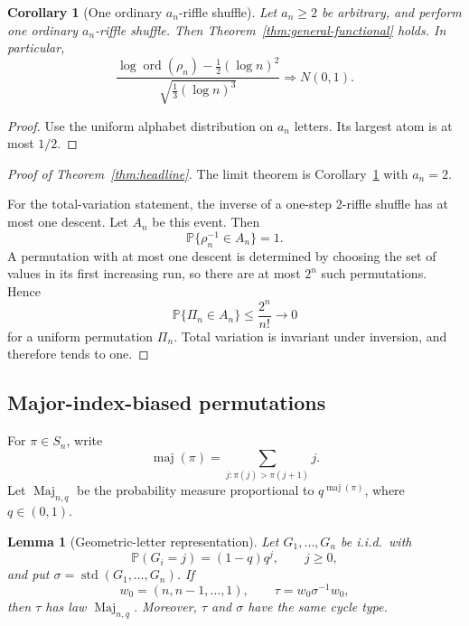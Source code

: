 \documentclass[11pt]{article}
\newtheorem{lemma}[theorem]{Lemma}
\newtheorem{corollary}[theorem]{Corollary}
\theoremstyle{definition}
\theoremstyle{remark}
\newcommand{\Pp}{\mathbb P}
\newcommand{\ord}{\operatorname{ord}}
\begin{document}
\begin{corollary}[One ordinary $a_n$-riffle shuffle]
\label{cor:ordinary-riffle}
Let $a_n\ge2$ be arbitrary, and perform one ordinary $a_n$-riffle shuffle.
Then Theorem~\ref{thm:general-functional} holds.  In particular,
\[
 \frac{\log\ord(\rho_n)-\frac12(\log n)^2}
 {\sqrt{\frac13(\log n)^3}}
 \Rightarrow N(0,1).
\]
\end{corollary}

\begin{proof}
Use the uniform alphabet distribution on $a_n$ letters.  Its largest atom
is at most $1/2$.
\end{proof}

\begin{proof}[Proof of Theorem~\ref{thm:headline}]
The limit theorem is Corollary~\ref{cor:ordinary-riffle} with $a_n=2$.

For the total-variation statement, the inverse of a one-step $2$-riffle
shuffle has at most one descent.  Let $A_n$ be this event.  Then
\[
 \Pp\{\rho_n^{-1}\in A_n\}=1.
\]
A permutation with at most one descent is determined by choosing the set
of values in its first increasing run, so there are at most $2^n$ such
permutations.  Hence
\[
 \Pp\{\Pi_n\in A_n\}\le\frac{2^n}{n!}\longrightarrow0
\]
for a uniform permutation $\Pi_n$.  Total variation is invariant under
inversion, and therefore tends to one.
\end{proof}

\subsection{Major-index-biased permutations}

For $\pi\in S_n$, write
\[
 \operatorname{maj}(\pi)
 =
 \sum_{j:\pi(j)>\pi(j+1)}j.
\]
Let $\operatorname{Maj}_{n,q}$ be the probability measure proportional to
$q^{\operatorname{maj}(\pi)}$, where $q\in(0,1)$.

\begin{lemma}[Geometric-letter representation]\label{lem:maj-representation}
Let $G_1,\ldots,G_n$ be i.i.d.\ with
\[
 \Pp(G_i=j)=(1-q)q^j,\qquad j\ge0,
\]
and put $\sigma=\operatorname{std}(G_1,\ldots,G_n)$.  If
\[
 w_0=(n,n-1,\ldots,1),
 \qquad
 \tau=w_0\sigma^{-1}w_0,
\]
then $\tau$ has law $\operatorname{Maj}_{n,q}$.  Moreover, $\tau$ and
$\sigma$ have the same cycle type.
\end{lemma}
\end{document}
